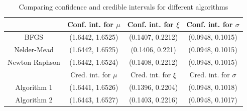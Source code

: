 \documentclass[12pt]{article}
\begin{document}
\begin{enumerate}[label=(\alph*)]
\begin{table}[H]
\centering
\caption{Comparing confidence and credible intervals for different algorithms}
\label{my-label}
\begin{tabular}{|c|c|c|c|}
\hline
               & Conf. int. for $\mu$ & Conf. int. for $\xi$ & Conf. int. for $\sigma$ \\ \hline
BFGS           &(1.6442, 1.6525)&(0.1407, 0.2212)&(0.0948, 0.1015) \\ \hline
Nelder-Mead    &(1.6442, 1.6525)  &(0.1406, 0.221)   & (0.0948, 0.1015)\\ \hline
Newton Raphson &(1.6442, 1.6524)  &(0.1408, 0.2212) &(0.0948, 0.1015)\\ \hline
               &Cred. int. for $\mu$ & Cred. int. for $\xi$ & Cred. int. for $\sigma$ \\ \hline
Algorithm 1    &(1.6441, 1.6526)&(0.1396, 0.2204)&(0.0948, 0.1018)\\ \hline
Algorithm 2    &(1.6443, 1.6527)&(0.1403, 0.2216)&(0.0948, 0.1017)\\ \hline
\end{tabular}
\end{table}

\end{enumerate}

\end{document}
